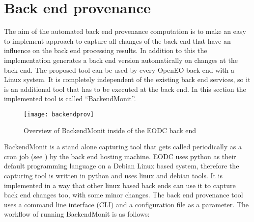 \documentclass[draft,final]{vutinfth} %
\begin{document}
\section{Back end provenance}\label{Implementation:Back end provenance}
The aim of the automated back end provenance computation is to make an easy to implement approach to capture all changes of the back end that have an influence on the back end processing results. In addition to this the implementation generates a back end version automatically on changes at the back end. The proposed tool can be used by every OpenEO back end with a Linux system. It is completely independent of the existing back end services, so it is an additional tool that has to be executed at the back end. In this section the implemented tool is called “BackendMonit”. 
\begin{figure}[h]
	\centering
	\texttt{[image: backendprov]}
	\caption{Overview of BackendMonit inside of the EODC back end}
	\label{fig:backendprov} %
\end{figure}

BackendMonit is a stand alone capturing tool that gets called periodically as a cron job (see \cite{crontab}) by the back end hosting machine. EODC uses python as their default programming language on a Debian Linux based system, therefore the capturing tool is written in python and uses linux and debian tools. It is implemented in a way that other linux based back ends can use it to capture back end changes too, with some minor changes. The back end provenance tool uses a command line interface (CLI)  and a configuration file as a parameter. 
The workflow of running BackendMonit is as follows: 
\end{document}
